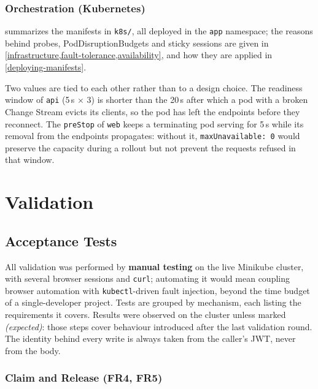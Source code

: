 \documentclass{scrartcl}
\begin{document}
\subsubsection{Orchestration (Kubernetes)}\label{orchestration}

 summarizes the manifests in \texttt{k8s/}, all deployed in the \texttt{app} namespace; the reasons behind probes, PodDisruptionBudgets and sticky sessions are given in \cref{infrastructure,fault-tolerance,availability}, and how they are applied in \cref{deploying-manifests}.

Two values are tied to each other rather than to a design choice. The readiness window of \texttt{api} (5\,s $\times$ 3) is shorter than the 20\,s after which a pod with a broken Change Stream evicts its clients, so the pod has left the endpoints before they reconnect. The \texttt{preStop} of \texttt{web} keeps a terminating pod serving for 5\,s while its removal from the endpoints propagates: without it, \texttt{maxUnavailable: 0} would preserve the capacity during a rollout but not prevent the requests refused in that window.

\section{Validation}\label{validation}
\subsection{Acceptance Tests}\label{acceptance-test}

All validation was performed by \textbf{manual testing} on the live Minikube cluster, with several browser sessions and \texttt{curl}; automating it would mean coupling browser automation with \texttt{kubectl}-driven fault injection, beyond the time budget of a single-developer project. Tests are grouped by mechanism, each listing the requirements it covers. Results were observed on the cluster unless marked \emph{(expected)}: those steps cover behaviour introduced after the last validation round. The identity behind every write is always taken from the caller's JWT, never from the body.

\subsubsection{Claim and Release (FR4, FR5)}
\end{document}
